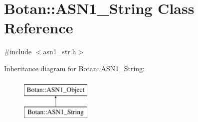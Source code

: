 \hypertarget{classBotan_1_1ASN1__String}{\section{Botan\-:\-:A\-S\-N1\-\_\-\-String Class Reference}
\label{classBotan_1_1ASN1__String}
}


{\ttfamily \#include $<$asn1\-\_\-str.\-h$>$}

Inheritance diagram for Botan\-:\-:A\-S\-N1\-\_\-\-String\-:\begin{figure}[H]
\begin{center}
\leavevmode
\includegraphics[height=2.000000cm]{classBotan_1_1ASN1__String}
\end{center}
\end{figure}
